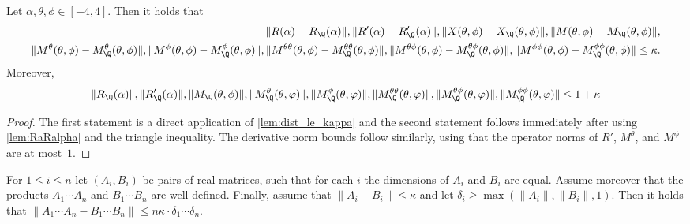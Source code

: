 \begin{corollary} \label{corr:kappa1kappa}
\leanok
{}
    Let $\alpha,\theta,\phi\in [-4,4]$. Then it holds that
    \begin{align*}
        \|R(\alpha)-R_{\Q}(\alpha)\|, \|R'(\alpha)-R_{\Q}'(\alpha)\|,\|X(\theta,\phi)-X_{\Q}(\theta, \phi)\|, \|M(\theta, \phi)-M_{\Q}(\theta, \phi)\|, \\
        \|M^\theta(\theta,\phi)-M_{\Q}^\theta(\theta,\phi)\|,
        \|M^\phi(\theta,\phi) - M_{\Q}^\phi(\theta,\phi)\|,
        \|M^{\theta\theta}(\theta,\phi)-M_{\Q}^{\theta\theta}(\theta,\phi)\|,
        \|M^{\theta\phi}(\theta,\phi)-M_{\Q}^{\theta\phi}(\theta,\phi)\|,
        \|M^{\phi\phi}(\theta,\phi)-M_{\Q}^{\phi\phi}(\theta,\phi)\|\leq \kappa.
    \end{align*}
    Moreover,
    \[
        \|R_{\Q}(\alpha)\|, \|R'_{\Q}(\alpha)\|, \|M_{\Q}(\theta, \phi)\|, \|M_{\Q}^{\theta}(\theta,\varphi)\|, \|M_{\Q}^{\phi}(\theta,\varphi)\|,
        \|M_{\Q}^{\theta\theta}(\theta,\varphi)\|, \|M_{\Q}^{\theta\phi}(\theta,\varphi)\|, \|M_{\Q}^{\phi\phi}(\theta,\varphi)\| \leq 1+\kappa
    \]
\end{corollary}

\begin{proof}
\leanok
{}
    The first statement is a direct application of \cref{lem:dist_le_kappa} and the second statement follows immediately after using \cref{lem:RaRalpha} and the triangle inequality.
    The derivative norm bounds follow similarly, using that the operator norms of $R'$, $M^\theta$, and $M^\phi$ are at most~$1$.
\end{proof}

\begin{lemma} \label{lem:A1AnB1Bn}
\leanok
    For $1 \leq i \leq n$ let $(A_i,B_i)$ be pairs of real matrices, such that for each $i$ the dimensions of $A_i$ and $B_i$ are equal. Assume moreover that the products $A_1\cdots A_n$ and $B_1 \cdots B_n$ are well defined. Finally, assume that $\|A_i-B_i\|\leq \kappa$ and let $\delta_i\geq \max(\|A_i\|,\|B_i\|,1)$. Then it holds that
    $\|A_1\cdots A_n-B_1\cdots B_n\|\leq n\kappa\cdot \delta_1\cdots \delta_n$.
\end{lemma}

